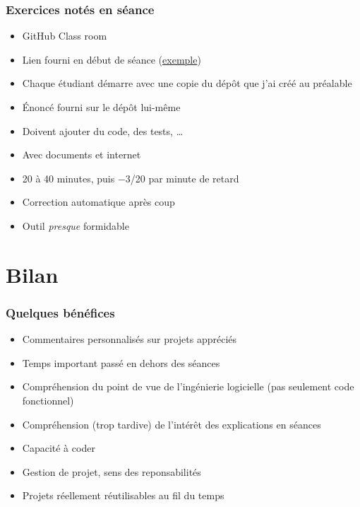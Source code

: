 \documentclass[french]{beamer}
\begin{document}
\begin{frame}
	\frametitle{Exercices notés en séance}
	\begin{itemize}
		\item GitHub Class room
		\item Lien fourni en début de séance (\href{https://classroom.github.com/a/Ny5sBwFU}{exemple})
		\item Chaque étudiant démarre avec une copie du dépôt que j’ai créé au préalable
		\item Énoncé fourni sur le dépôt lui-même
		\item Doivent ajouter du code, des tests, …
		\item Avec documents et internet
		\item 20 à 40 minutes, puis −3/20 par minute de retard
		\item Correction automatique après coup
		\item Outil \emph{presque} formidable
	\end{itemize}
\end{frame}

\section{Bilan}
\begin{frame}
	\frametitle{Quelques bénéfices}
	\begin{itemize}
		\item Commentaires personnalisés sur projets appréciés
		\item Temps important passé en dehors des séances
		\item Compréhension du point de vue de l’ingénierie logicielle (pas seulement code fonctionnel)
		\item Compréhension (trop tardive) de l’intérêt des explications en séances
		\item Capacité à coder
		\item Gestion de projet, sens des reponsabilités
		\item Projets réellement réutilisables au fil du temps
	\end{itemize}
\end{frame}
\end{document}
